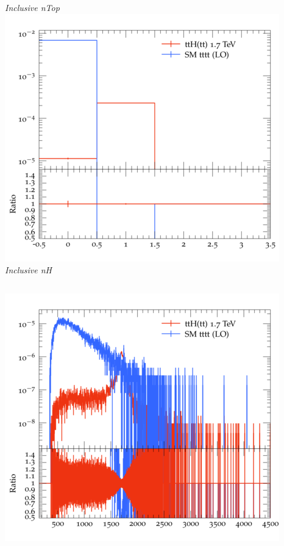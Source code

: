 \documentclass{beamer}
\begin{document}
\begin{frame}
\begin{columns}
\textit{\small Inclusive nTop}
\includegraphics[width=\textwidth]{../plots/ttH_1700/tttt_ttH/Inclusive_nH.png}\\
\textit{\small Inclusive nH}
\end{columns}
\begin{columns}
\includegraphics[width=\textwidth]{../plots/ttH_1700/tttt_ttH/Inclusive_InvM_ttbar12.png}\\

\end{columns}
\end{frame}
\end{document}
